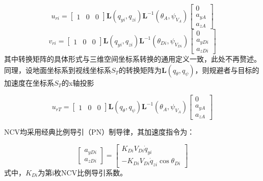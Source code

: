 \begin{equation}
\label{eq:6}
{u_{ri}} = \left[ {\begin{array}{*{20}{c}}
  1&0&0 
\end{array}} \right]{\mathbf{L}}({q_{yi}},{q_{zi}}){{\mathbf{L}}^{ - 1}}({\theta _A},{\psi _{{V_A}}})\left[ {\begin{array}{*{20}{c}}
  0 \\ 
  {{a_{yA}}} \\ 
  {{a_{zA}}} 
\end{array}} \right]
\end{equation}
\begin{equation}
\label{eq:7}
{v_{ri}} = \left[ {\begin{array}{*{20}{c}}
  1&0&0 
\end{array}} \right]{\mathbf{L}}({q_{yi}},{q_{zi}}){{\mathbf{L}}^{ - 1}}({\theta _{Di}},{\psi _{{V_{Di}}}})\left[ {\begin{array}{*{20}{c}}
  0 \\ 
  {{a_{yDi}}} \\ 
  {{a_{zDi}}} 
\end{array}} \right]
\end{equation}
其中转换矩阵的具体形式与三维空间坐标系转换的通用定义一致，此处不再赘述。同理，设地面坐标系到视线坐标系${S_T}$的转换矩阵为${\mathbf{L}}({q_\theta },{q_\psi })$，则规避者与目标的加速度在坐标系${S_T}$的x轴投影

\begin{equation}
\label{eq:8}
{u_{rT}} = \left[ {\begin{array}{*{20}{c}}
  1&0&0 
\end{array}} \right]{\mathbf{L}}({q_\theta },{q_\psi }){{\mathbf{L}}^{ - 1}}({\theta _A},{\psi _{{V_A}}})\left[ {\begin{array}{*{20}{c}}
  0 \\ 
  {{a_{yA}}} \\ 
  {{a_{zA}}} 
\end{array}} \right]
\end{equation}
\begin{assumption}
NCV均采用经典比例导引（PN）制导律，其加速度指令为：
\end{assumption}
\begin{equation}
\label{eq:9}
\left[ {\begin{array}{*{20}{c}}
  {{a_{yDi}}} \\ 
  {{a_{zDi}}} 
\end{array}} \right] = \left[ {\begin{array}{*{20}{c}}
  {{K_{Di}}{V_{Di}}{{\dot q}_{yi}}} \\ 
  { - {K_{Di}}{V_{Di}}{{\dot q}_{zi}}\cos {\theta _{Di}}} 
\end{array}} \right]
\end{equation}
式中，${K_{Di}}$为第i枚NCV比例导引系数。

